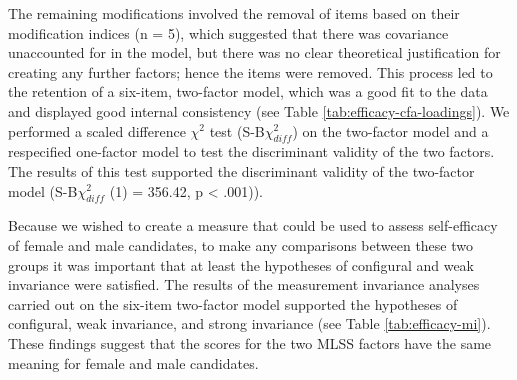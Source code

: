\documentclass[
  12pt,
  a4paper,
]{book}
\begin{document}
The remaining modifications involved the removal of items based on their modification indices (n = 5), which suggested that there was covariance unaccounted for in the model, but there was no clear theoretical justification for creating any further factors; hence the items were removed. This process led to the retention of a six-item, two-factor model, which was a good fit to the data and displayed good internal consistency (see Table \ref{tab:efficacy-cfa-loadings}). We performed a \citet{Satorra2001} scaled difference \(\chi^2\) test (S-B\(\chi^2_{diff}\)) on the two-factor model and a respecified one-factor model to test the discriminant validity of the two factors. The results of this test supported the discriminant validity of the two-factor model (S-B\(\chi^2_{diff}\) (1) = 356.42, p \textless{} .001)).

Because we wished to create a measure that could be used to assess self-efficacy of female and male candidates, to make any comparisons between these two groups it was important that at least the hypotheses of configural and weak invariance were satisfied. The results of the measurement invariance analyses carried out on the six-item two-factor model supported the hypotheses of configural, weak invariance, and strong invariance (see Table \ref{tab:efficacy-mi}). These findings suggest that the scores for the two MLSS factors have the same meaning for female and male candidates.
\end{document}
